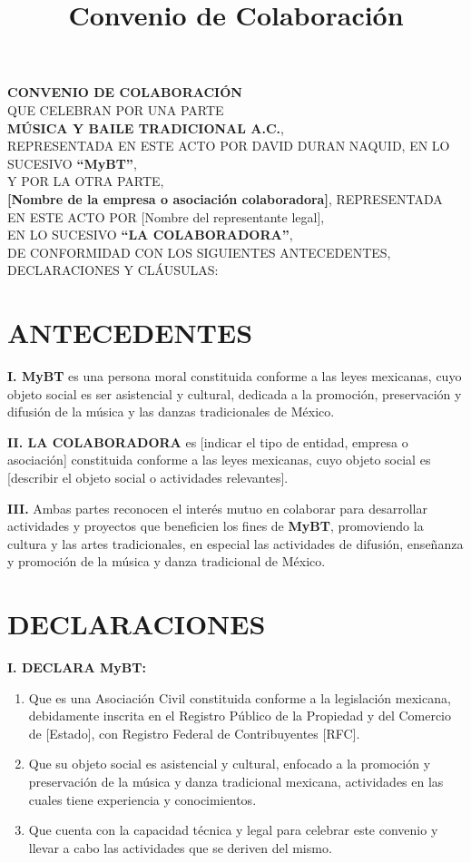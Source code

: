 \documentclass[a4paper,12pt]{article}
\title{Convenio de Colaboración}
\author{}  %
\date{}
\begin{document}
\maketitle

\begin{center}
    \textbf{CONVENIO DE COLABORACIÓN} \\
    QUE CELEBRAN POR UNA PARTE \\
    \textbf{MÚSICA Y BAILE TRADICIONAL A.C.}, \\
    REPRESENTADA EN ESTE ACTO POR DAVID DURAN NAQUID, EN LO SUCESIVO \textbf{``MyBT''}, \\
    Y POR LA OTRA PARTE, \\
    \textbf{[Nombre de la empresa o asociación colaboradora]}, REPRESENTADA EN ESTE ACTO POR [Nombre del representante legal], \\
    EN LO SUCESIVO \textbf{``LA COLABORADORA''}, \\
    DE CONFORMIDAD CON LOS SIGUIENTES ANTECEDENTES, DECLARACIONES Y CLÁUSULAS:
\end{center}

\section*{ANTECEDENTES}

\textbf{I. MyBT} es una persona moral constituida conforme a las leyes mexicanas, cuyo objeto social es ser asistencial y cultural, dedicada a la promoción, preservación y difusión de la música y las danzas tradicionales de México.

\textbf{II. LA COLABORADORA} es [indicar el tipo de entidad, empresa o asociación] constituida conforme a las leyes mexicanas, cuyo objeto social es [describir el objeto social o actividades relevantes].

\textbf{III.} Ambas partes reconocen el interés mutuo en colaborar para desarrollar actividades y proyectos que beneficien los fines de \textbf{MyBT}, promoviendo la cultura y las artes tradicionales, en especial las actividades de difusión, enseñanza y promoción de la música y danza tradicional de México.

\section*{DECLARACIONES}

\textbf{I. DECLARA MyBT:}
\begin{enumerate}
    \item Que es una Asociación Civil constituida conforme a la legislación mexicana, debidamente inscrita en el Registro Público de la Propiedad y del Comercio de [Estado], con Registro Federal de Contribuyentes [RFC].
    \item Que su objeto social es asistencial y cultural, enfocado a la promoción y preservación de la música y danza tradicional mexicana, actividades en las cuales tiene experiencia y conocimientos.
    \item Que cuenta con la capacidad técnica y legal para celebrar este convenio y llevar a cabo las actividades que se deriven del mismo.
\end{enumerate}
\end{document}
